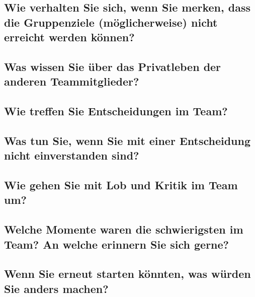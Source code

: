 \subsection*{Wie verhalten Sie sich, wenn Sie merken, dass die Gruppenziele (möglicherweise)
nicht erreicht werden können?}

\subsection*{Was wissen Sie über das Privatleben der anderen Teammitglieder?}

\subsection*{Wie treffen Sie Entscheidungen im Team?}

\subsection*{Was tun Sie, wenn Sie mit einer Entscheidung nicht einverstanden sind?}

\subsection*{Wie gehen Sie mit Lob und Kritik im Team um?}

\subsection*{Welche Momente waren die schwierigsten im Team? An welche erinnern Sie sich
gerne?}

\subsection*{Wenn Sie erneut starten könnten, was würden Sie anders machen?}


